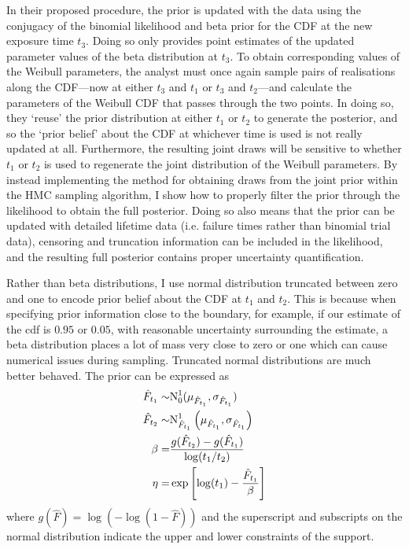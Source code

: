 In their proposed procedure, the prior is updated with the data using the conjugacy of the binomial likelihood and beta prior for the CDF at the new exposure time $t_3$. Doing so only provides point estimates of the updated parameter values of the beta distribution at $t_3$. To obtain corresponding values of the Weibull parameters, the analyst must once again sample pairs of realisations along the CDF---now at either $t_3$ and $t_1$ or $t_3$ and $t_2$---and calculate the parameters of the Weibull CDF that passes through the two points. In doing so, they `reuse' the prior distribution at either $t_1$ or $t_2$ to generate the posterior, and so the `prior belief' about the CDF at whichever time is used is not really updated at all. Furthermore, the resulting joint draws will be sensitive to whether $t_1$ or $t_2$ is used to regenerate the joint distribution of the Weibull parameters. By instead implementing the method for obtaining draws from the joint prior within the HMC sampling algorithm, I show how to properly filter the prior through the likelihood to obtain the full posterior. Doing so also means that the prior can be updated with detailed lifetime data (i.e. failure times rather than binomial trial data), censoring and truncation information can be included in the likelihood, and the resulting full posterior contains proper uncertainty quantification. 

Rather than beta distributions, I use normal distribution truncated between zero and one to encode prior belief about the CDF at $t_1$ and $t_2$. This is because when specifying prior information close to the boundary, for example, if our estimate of the cdf is $0.95$ or $0.05$, with reasonable uncertainty surrounding the estimate, a beta distribution places a lot of mass very close to zero or one which can cause numerical issues during sampling. Truncated normal distributions are much better behaved. The prior can be expressed as
\begin{align*}
    \hat{F}_{t_1} \sim & \hbox{N}^{1}_{0}(\mu_{\hat{F}_{t_1}}, \sigma_{\hat{F}_{t_1}})             \\
    \hat{F}_{t_2} \sim & \hbox{N}^{1}_{\hat{F}_{t_1}}\left(\mu_{\hat{F}_{t_1}}, \sigma_{\hat{F}_{t_1}}\right) \\
    \beta            = & \frac{g(\hat{F}_{t_2}) - g(\hat{F}_{t_1})}{\log(t_1 / t_2)}               \\
    \eta             = & \exp\left[\log(t_1) - \frac{\hat{F}_{t_1}}{\beta}\right]
\end{align*}
where $g(\hat{F}) = \log(-\log(1 - \hat{F}))$ and the superscript and subscripts on the normal distribution indicate the upper and lower constraints of the support.

